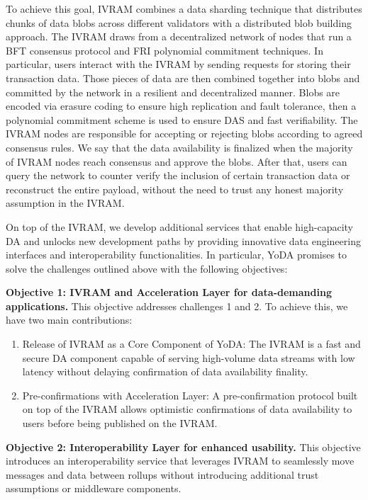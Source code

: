 \documentclass[11pt]{article}
\begin{document}
To achieve this goal, IVRAM combines a data sharding technique that distributes chunks of data blobs across different validators with a distributed blob building approach. The IVRAM draws from a decentralized network of nodes that run a BFT consensus protocol and FRI polynomial commitment techniques. In particular, users interact with the IVRAM by sending requests for storing their transaction data. Those pieces of data are then combined together into blobs and committed by the network in a resilient and decentralized manner. Blobs are encoded via erasure coding \cite{Geisel1990TutorialOR} to ensure high replication and fault tolerance, then a polynomial commitment scheme is used to ensure DAS and fast verifiability. The IVRAM nodes are responsible for accepting or rejecting blobs according to agreed consensus rules. We say that the data availability is finalized when the majority of IVRAM nodes reach consensus and approve the blobs. After that, users can query the network to counter verify the inclusion of certain transaction data or reconstruct the entire payload, without the need to trust any honest majority assumption in the IVRAM.

On top of the IVRAM, we develop additional services that enable high-capacity DA and unlocks new development paths by providing innovative data engineering interfaces and interoperability functionalities. In particular, YoDA promises to solve the challenges outlined above with the following objectives:

\noindent \textbf{Objective 1: IVRAM and Acceleration Layer for data-demanding applications.} This objective addresses challenges 1 and 2. To achieve this, we have two main contributions:
\begin{enumerate}
    \item Release of IVRAM as a Core Component of YoDA: The IVRAM is a fast and secure DA component capable of serving high-volume data streams with low latency without delaying confirmation of data availability finality.
    \item Pre-confirmations with Acceleration Layer: A pre-confirmation protocol built on top of the IVRAM allows optimistic confirmations of data availability to users before being published on the IVRAM.
\end{enumerate}

\noindent \textbf{Objective 2: Interoperability Layer for enhanced usability.} This objective introduces an interoperability service that leverages IVRAM to seamlessly move messages and data between rollups without introducing additional trust assumptions or middleware components.
\end{document}
